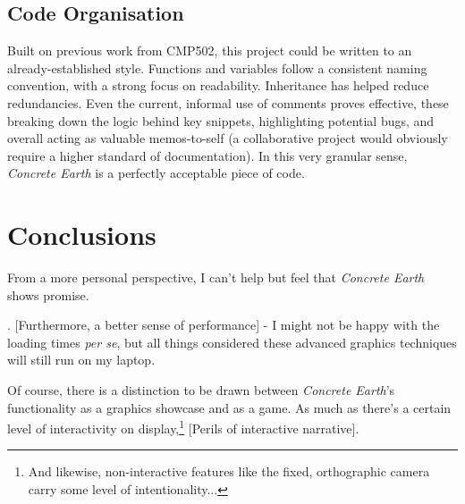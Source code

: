 \documentclass[a4paper, 11pt]{article}
\begin{document}
\begin{flushleft}
\subsection{Code Organisation}

Built on previous work from CMP502, this project could be written to an already-established style. Functions and variables follow a consistent naming convention, with a strong focus on readability. Inheritance has helped reduce redundancies. Even the current, informal use of comments proves effective, these breaking down the logic behind key snippets, highlighting potential bugs, and overall acting as valuable memos-to-self (a collaborative project would obviously require a higher standard of documentation). In this very granular sense, \textit{Concrete Earth} is a perfectly acceptable piece of code.

\vspace{5pt}

\vspace{5pt}

\vspace{5pt}

\section{Conclusions}

From a more personal perspective, I can't help but feel that \textit{Concrete Earth} shows promise.

\vspace{5pt}. [Furthermore, a better sense of performance] - I might not be happy with the loading times \textit{per se}, but all things considered these advanced graphics techniques will still run on my laptop.

\vspace{5pt}\noindent
Of course, there is a distinction to be drawn between \textit{Concrete Earth}'s functionality as a graphics showcase and as a game. As much as there's a certain level of interactivity on display,\footnote{And likewise, non-interactive features like the fixed, orthographic camera carry some level of intentionality...} [Perils of interactive narrative].


\end{flushleft}
\end{document}
